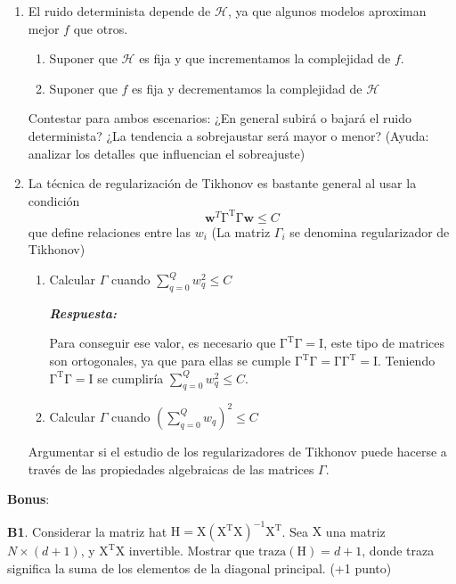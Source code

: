 \documentclass[  DIV=calc,%
paper=a4,%
fontsize=11pt]{scrartcl}             %
\newcommand{\miit}[1]{{\textbf{\textit{#1}}}}
\begin{document}
\begin{enumerate}
    \item El ruido determinista depende de $\mathcal{H}$, ya que algunos modelos aproximan mejor $f$ que otros.
    \begin{enumerate}
      \item Suponer que $\mathcal{H}$ es fija y que incrementamos la complejidad de $f$.
      \item Suponer que $ f$ es fija y decrementamos la complejidad de $\mathcal{H}$
    \end{enumerate}
    Contestar para ambos escenarios: ¿En general subirá o bajará el ruido determinista? ¿La tendencia a sobrejaustar será mayor o menor? (Ayuda: analizar los detalles que influencian el sobreajuste)
    \item La técnica de regularización de Tikhonov es bastante general al usar la condición
    \[
      \textbf{w}^T\mathrm{\Gamma^T\Gamma}\textbf{w}\leq C
    \]
    que define relaciones entre las $w_i$ (La matriz $\Gamma_i$ se denomina regularizador de Tikhonov)
    \begin{enumerate}
      \item Calcular $\Gamma$ cuando $\sum_{q=0}^Q w_q^2 \leq C$

      \miit{Respuesta:}

      Para conseguir ese valor, es necesario que $\mathrm{\Gamma^T\Gamma = I}$, este tipo de matrices son ortogonales, ya que para ellas se cumple
      $\mathrm{\Gamma^T\Gamma = \Gamma\Gamma^T = I}$. Teniendo $\mathrm{\Gamma^T\Gamma = I}$ se cumpliría $\sum_{q=0}^Q w_q^2 \leq C$.

      \item Calcular $\Gamma$ cuando $(\sum_{q=0}^Q w_q)^2 \leq C$
    \end{enumerate}
    Argumentar si el estudio de los regularizadores de Tikhonov puede hacerse a través de las propiedades algebraicas de las matrices $\Gamma$.
  \end{enumerate}

  \textbf{Bonus}:

  \textbf{B1}. Considerar la matriz hat $\mathrm{H}=\mathrm{X(X^TX)^{-1}X^T}$. Sea $\mathrm{X}$ una matriz  $N\times (d+1)$, y $\mathrm{X^TX}$ invertible. Mostrar que $\mathrm{traza(H)}=d+1$, donde traza significa la suma de los elementos de la diagonal principal. (+1 punto)
\end{document}
